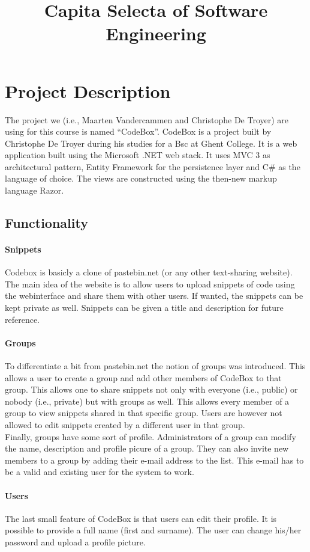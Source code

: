 \documentclass {article}
\title {Capita Selecta of Software Engineering}
\begin{document}
\maketitle
\section{Project Description}
The project we (i.e., Maarten Vandercammen and Christophe De Troyer) are using
for this course is named ``CodeBox''. CodeBox is a project built by Christophe
De Troyer during his studies for a Bsc at Ghent College. It is a web
application built using the Microsoft .NET web stack. It uses MVC 3 as architectural
pattern, Entity Framework for the persistence layer and C\# as the language of
choice. The views are constructed using the then-new markup language Razor.
\subsection{Functionality}
\paragraph{Snippets}
Codebox is basicly a clone of pastebin.net (or any other text-sharing
website). The main idea of the website is to allow users to upload snippets of
code using the webinterface and share them with other users. If wanted, the
snippets can be kept private as well. Snippets can be given a title and
description for future reference.

\paragraph{Groups}
To differentiate a bit from pastebin.net the notion of groups was
introduced. This allows a user to create a group and add other members of
CodeBox to that group. This allows one to share snippets not only with everyone
(i.e., public) or nobody (i.e., private) but with groups as well. This allows
every member of a group to view snippets shared in that specific group. Users
are however not allowed to edit snippets created by a different user in that
group.\\ Finally, groups have some sort of profile. Administrators of a group
can modify the name, description and profile picure of a group. They can also
invite new members to a group by adding their e-mail address to the list. This
e-mail has to be a valid and existing user for the system to work.

\paragraph{Users}
The last small feature of CodeBox is that users can edit their profile. It is
possible to provide a full name (first and surname). The user can change his/her
password and upload a profile picture.
\end{document}
